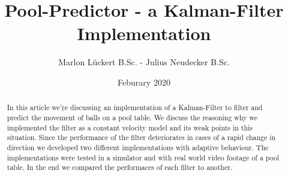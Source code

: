 \documentclass[notitlepage, a4paper, 11pt]{scrartcl}
\begin{document}
\title{Pool-Predictor - a Kalman-Filter Implementation}
\author{Marlon Lückert B.Sc. - Julius Neudecker B.Sc.}
\date{Feburary 2020}

\maketitle

\begin{abstract}
In this article we're discussing an implementation of a Kalman-Filter to filter and predict the movement of balls on a pool table. 
We discuss the reasoning why we implemented the filter as a constant velocity model and its weak points in this situation.
Since the performance of the filter deteriorates in cases of a rapid change in direction we developed two different implementations with adaptive behaviour.
The implementations were tested in a simulator and with real world video footage of a pool table.
In the end we compared the performaces of each filter to another.

\end{abstract}
\end{document}
